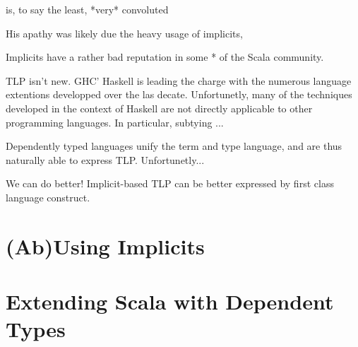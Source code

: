 \memImplicitRemoveCodeSection



is, to say the least, *very* convoluted


His apathy was likely due the heavy usage of implicits,

Implicits have a rather bad reputation in some * of the Scala community.


TLP isn't new. GHC' Haskell is leading the charge with the numerous language extentions developped over the las decate. Unfortunetly, many of the techniques developed in the context of Haskell are not directly applicable to other programming languages. In particular, subtying ...

Dependently typed languages unify the term and type language, and are thus naturally able to express TLP. Unfortunetly...

We can do better! Implicit-based TLP can be better expressed by first class language construct.




\lipsum[1]

\chapter{(Ab)Using Implicits}
\label{chap:ab-using-implicits}
\lipsum[1]

\chapter{Extending Scala with Dependent Types}
\label{chap:extending-scala-with-dependent-types}
\lipsum[1]

